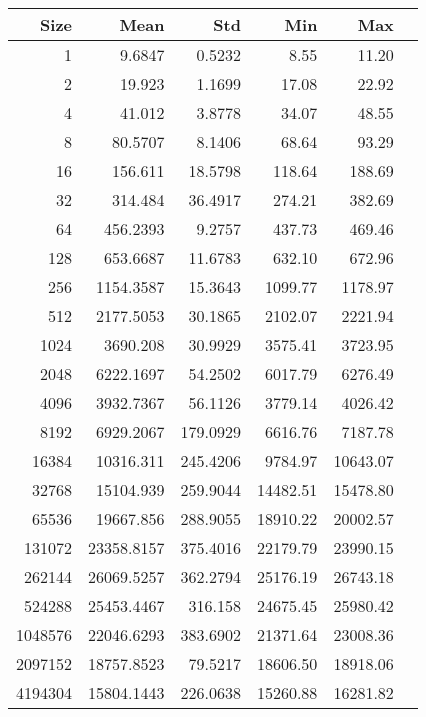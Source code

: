 
\begin{table}[htbp]
  \centering
  \begin{minipage}{.48\textwidth}
    \centering
    \footnotesize
  \begin{tabular}{rrrrrr}
	\toprule
	\textbf{Size} & \textbf{Mean} & \textbf{Std} & \textbf{Min} & \textbf{Max}	\\
	\midrule
	1	&	9.6847   	&	0.5232	&	8.55	&	11.20	\\
	2	&	19.923   	&	1.1699	&	17.08	&	22.92	\\
	4	&	41.012   	&	3.8778	&	34.07	&	48.55	\\
	8	&	80.5707   	&	8.1406	&	68.64	&	93.29	\\
	16	&	156.611   	&	18.5798	&	118.64	&	188.69	\\
	32	&	314.484   	&	36.4917	&	274.21	&	382.69	\\
	64	&	456.2393   	&	9.2757	&	437.73	&	469.46	\\
	128	&	653.6687   	&	11.6783	&	632.10	&	672.96	\\
	256	&	1154.3587   	&	15.3643	&	1099.77	&	1178.97	\\
	512	&	2177.5053   	&	30.1865	&	2102.07	&	2221.94	\\
	1024	&	3690.208   	&	30.9929	&	3575.41	&	3723.95	\\
	2048	&	6222.1697   	&	54.2502	&	6017.79	&	6276.49	\\
	4096	&	3932.7367   	&	56.1126	&	3779.14	&	4026.42	\\
	8192	&	6929.2067   	&	179.0929	&	6616.76	&	7187.78	\\
	16384	&	10316.311   	&	245.4206	&	9784.97	&	10643.07	\\
	32768	&	15104.939   	&	259.9044	&	14482.51	&	15478.80	\\
	65536	&	19667.856   	&	288.9055	&	18910.22	&	20002.57	\\
	131072	&	23358.8157   	&	375.4016	&	22179.79	&	23990.15	\\
	262144	&	26069.5257   	&	362.2794	&	25176.19	&	26743.18	\\
	524288	&	25453.4467   	&	316.158	&	24675.45	&	25980.42	\\
	1048576	&	22046.6293   	&	383.6902	&	21371.64	&	23008.36	\\
	2097152	&	18757.8523   	&	79.5217	&	18606.50	&	18918.06	\\
	4194304	&	15804.1443   	&	226.0638	&	15260.88	&	16281.82	\\

\end{tabular}
\end{minipage}
\end{table}
